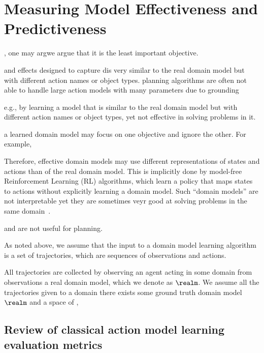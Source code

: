 \section{Measuring Model Effectiveness and Predictiveness}





, one may argwe argue that it is the least important objective. 



and effects designed to capture dis very similar to the real domain model but with different action names or object types.
planning algorithms are often not able to handle large action models with many parameters due to grounding 


e.g., by learning a model that is similar to the real domain model but with different action names or object types, yet not effective in solving problems in it.


a learned domain model may focus on one objective and ignore the other. 
For example, 

Therefore, effective domain models may use different representations of states and actions than of the real domain model. 
This is implicitly done by model-free Reinforcement Learning (RL) algorithms, which learn a policy that maps states to actions without explicitly learning a domain model. Such ``domain models'' are not interpretable yet they are sometimes veyr good at solving problems in the same domain~\cite{rlforplanning-paper}. 



and are not useful for planning.








As noted above, we assume that the input to a domain model learning algorithm is a set of trajectories, which are sequences of observations and actions.

All trajectories are collected by observing an agent acting in some domain from observations a real domain model, which we denote as $\realm$.
We assume all the trajectories given to a domain there exists some ground truth domain model $\realm$ and a space of , 




\subsection{Review of classical action model learning evaluation metrics}




